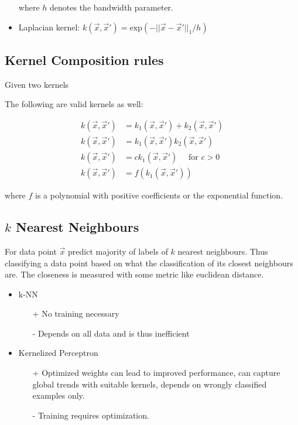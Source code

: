 \documentclass[10pt,a4paper]{scrartcl}
\begin{document}
\begin{multicols*}{2}
\begin{itemize}
where $h$ denotes the bandwidth parameter.
\item Laplacian kernel: $k(\vec{x},\vec{x}')=\text{exp}(-||\vec{x}-\vec{x}'||_1/h)$
\end{itemize}

\subsection{Kernel Composition rules}

Given two kernels 


The following are valid kernels as well:

\begin{align*}
k(\vec{x},\vec{x}')&=k_1(\vec{x},\vec{x}')+k_2(\vec{x},\vec{x}')\\
k(\vec{x},\vec{x}')&=k_1(\vec{x},\vec{x}')k_2(\vec{x},\vec{x}')\\
k(\vec{x},\vec{x}')&=ck_1(\vec{x},\vec{x}')\quad\text{ for }c>0\\
k(\vec{x},\vec{x}')&=f(k_1(\vec{x},\vec{x}'))
\end{align*}

where $f$ is a polynomial with positive coefficients or the exponential function.

\subsection{$k$ Nearest Neighbours}

For data point $\vec{x}$ predict majority of labels of $k$ nearest neighbours. Thus classifying a data point based on what the classification of its closest neighbours are. The closeness is measured with some metric like euclidean distance.


\begin{itemize}
\item k-NN
\begin{itemize}
\item[+] No training necessary
\item[-] Depends on all data and is thus inefficient
\end{itemize}
\item Kernelized Perceptron
\begin{itemize}
\item[+] Optimized weights can lead to improved performance, can capture global trends with suitable kernels, depends on wrongly classified examples only.
\item[-] Training requires optimization.
\end{itemize}
\end{itemize}


\end{multicols*}
\end{document}
